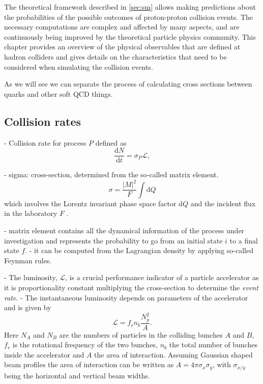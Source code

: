 
The theoretical framework described in \cref{sec:sm} allows making predictions about the probabilities of the possible outcomes of proton-proton collision events. 
The necessary computations are complex and affected by many aspects, and are continuously being improved by the theoretical particle physics community.
This chapter provides an overview of the physical observables that are defined at hadron colliders and gives details on the characteristics that need to be considered when simulating the collision events. 

As we will see we can separate the process of calculating cross sections between quarks and other soft QCD things.

\subsection{Collision rates}
- Collision rate for process $P$ defined as
\begin{equation}
  \frac{\mathrm{d}N}{\mathrm{d}t} = \sigma_P \mathcal{L},
\end{equation}

- sigma: cross-section, determined from the so-called matrix element. 
\begin{equation}
  \sigma = \frac{|M|^2}{F} \int \text{d}Q
\end{equation}
which involves the Lorentz invariant phase space factor d$Q$ and the incident flux in the laboratory $F$ \cite{Halzen:1984mc}.

- matrix element contains all the dynamical information of the process under investigation and represents the probability to go from an initial state $i$ to a final state $f$. 
- it can be computed from the Lagrangian density by applying so-called Feynman rules.


- The luminosity, $\mathcal{L}$, is a crucial performance indicator of a particle accelerator as it is proportionality constant multiplying the cross-section to determine the \emph{event rate}.
-  The instantaneous luminosity depends on parameters of the accelerator and is given by
\begin{equation}
  \mathcal{L} = f_rn_b\frac{N_p^2}{A}.
\end{equation}
Here $N_A$ and $N_B$ are the numbers of particles in the colliding bunches $A$ and $B$, $f_r$ is the rotational frequency of the two bunches, $n_b$ the total number of bunches inside the accelerator and $A$ the area of interaction. Assuming Gaussian shaped beam profiles the area of interaction can be written as $A = 4\pi \sigma_x \sigma_y$, with $\sigma_{x/y}$ being the horizontal and vertical beam widths.


